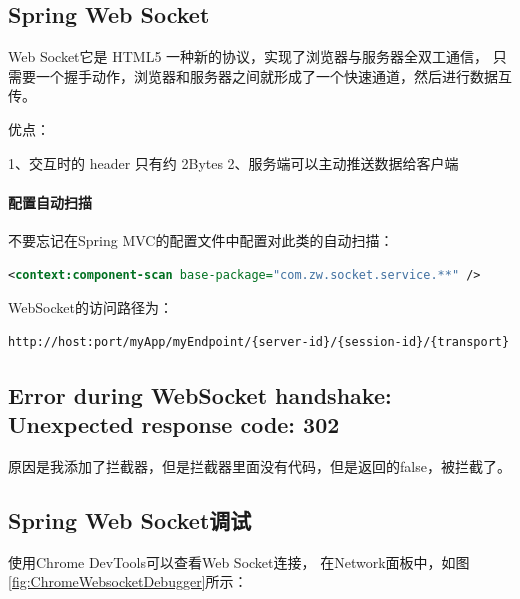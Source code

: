 \documentclass{book}
\begin{document}
\subsection{Spring Web Socket}

Web Socket它是 HTML5 一种新的协议，实现了浏览器与服务器全双工通信，
只需要一个握手动作，浏览器和服务器之间就形成了一个快速通道，然后进行数据互传。

优点：

1、交互时的 header 只有约 2Bytes
2、服务端可以主动推送数据给客户端

\paragraph{配置自动扫描}
不要忘记在Spring MVC的配置文件中配置对此类的自动扫描：

\begin{lstlisting}[language=XML]
<context:component-scan base-package="com.zw.socket.service.**" />
\end{lstlisting}

WebSocket的访问路径为：

\begin{lstlisting}[language=HTML]
http://host:port/myApp/myEndpoint/{server-id}/{session-id}/{transport}
\end{lstlisting}

\subsection{Error during WebSocket handshake: Unexpected response code: 302}
原因是我添加了拦截器，但是拦截器里面没有代码，但是返回的false，被拦截了。

\subsection{Spring Web Socket调试}

使用Chrome DevTools可以查看Web Socket连接，
在Network面板中，如图\ref{fig:ChromeWebsocketDebugger}所示：
\end{document}
